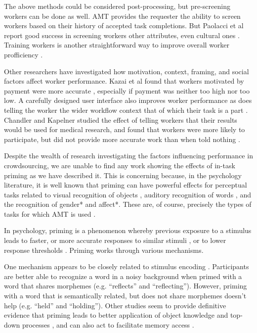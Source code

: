 \documentclass[a4paper]{report}
\begin{document}
The above methods could be considered post-processing, but pre-screening 
workers can be done as well. AMT provides the requester the ability to screen
workers based on their history of accepted task completions. But Paolacci et al
report good success in screening workers other attributes, even cultural ones
\cite{paolacci2010running}.  Training workers is another straightforward way 
to improve overall worker profficiency \cite{le2010ensuring}. 

Other researchers have investigated how motivation, context, framing, and 
social factors affect worker performance.  Kazai et al found that workers 
motivated by payment were more accurate \cite{kazai2013analysis}, especially
if payment was neither too high nor too low.
A carefully designed user interface also improves worker performance 
\cite{Finnerty2013} as does telling the worker the wider workflow context that
of which their task is a part \cite{Kinnaird2012281}. Chandler and Kapelner
studied the effect of telling workers that their results would be used for
medical research, and found that workers were more likely to participate, but
did not provide more accurate work than when told nothing 
\cite{chandler2013breaking}.

Despite the wealth of research investigating the factors influencing 
performance in crowdsourcing, we are unable to find any work showing the 
effects of in-task priming as we have described it.  This is concerning 
because, in the psychology literature, it is well known that priming can have 
powerful effects for perceptual tasks related to visual 
recognition of objects \cite{BJOP:BJOP1796}, auditory recognition of words 
\cite{BJOP:BJOP1826}, and the recognition
of gender* and affect*.  These are, of course, precisely the types of tasks 
for which AMT is used \cite{yuen2011survey, snow2008cheap}.


In psychology, priming is a phenomenon whereby previous exposure to a 
stimulus leads to faster, or more accurate responses to similar stimuli 
\cite{Ghuman17062008}, or to lower response thresholds \cite{BJOP:BJOP1826}.
Priming works through various mechanisms.  

One mechanism appears to be 
closely related to stimulus encoding \cite{BJOP:BJOP1826}.
Participants are better able to recognize a word in a noisy background when 
primed with a word that shares morphemes 
(e.g. ``reflects'' and ``reflecting'').  However, priming 
with a word that is semantically related, but does not share morphemes doesn't 
help (e.g. ``held'' and ``holding'')\cite{BJOP:BJOP1826}.  Other studies seem
to provide definitive evidence that priming leads to better 
application of object knowledge and top-down processes \cite{Ghuman17062008},
and can also act to facilitate memory access \cite{beller1971priming}.  
\end{document}
